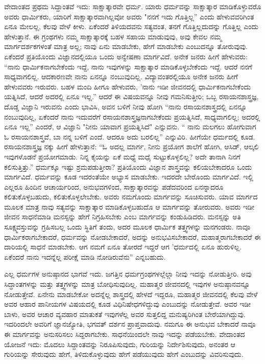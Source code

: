 ವೇದಾಂತದ ಪ್ರಥಮ ಸಿದ್ದಾಂತವೆ ಇದು: ಸಾಕ್ಷಾತ್ಕಾರವೇ ಧರ್ಮ. ಯಾರು ಧರ್ಮವನ್ನು ಸಾಕ್ಷಾತ್ಕಾರ ಮಾಡಿಕೊಳ್ಳುವರೊ ಅವರು ಧಾರ್ಮಿಕರು, ಯಾರಿಗೆ ಸಾಕ್ಷಾತ್ಕಾರವಾಗಿಲ್ಲವೋ ಅವರು "ನನಗೆ ಇದು ಗೊತ್ತಿಲ್ಲ” ಎಂದು ಹೇಳುವವರಿಗಿಂತ ಏನೂ ಮೇಲಲ್ಲ, ಕೆಲವು ವೇಳೆ ಕೀಳು. ಏಕೆಂದರೆ ತಿಳಿಯದವನು ಸತ್ಯವಂತ, ತನಗೆ ಗೊತ್ತಿಲ್ಲದುದನ್ನು ಗೊತ್ತಿಲ್ಲ ಎಂದು ಹೇಳುತ್ತಾನೆ. ಈ ಗ್ರಂಥಗಳು ನಮ್ಮ ಸಾಕ್ಷಾತ್ಕಾರಕ್ಕೆ ಬಹಳ ಸಹಾಯ ಮಾಡುವುವು, ಅವು ಕೇವಲ ನಮ್ಮ ಮಾರ್ಗದರ್ಶಕಗಳಂತೆ ಮಾತ್ರ ಅಲ್ಲ; ನಾವು ಏನು ಮಾಡಬೇಕು, ಹೇಗೆ ಮಾಡಬೇಕು ಎಂಬುದನ್ನೂ ತೋರುವುವು. ಏಕೆಂದರೆ ಪ್ರತಿಯೊಂದು ವಿಜ್ಞಾನದಲ್ಲಿಯೂ ಒಂದು ಅನ್ವೇಷಣಾ ಮಾರ್ಗವಿದೆ. ಅನೇಕ ಜನರು ಹೀಗೆ ಹೇಳುವರು: “ನಾನು ಧಾರ್ಮಿಕನಾಗಬೇಕೆಂದು ಇದ್ದೆ, ನಾನು ಇವುಗಳನ್ನು ಸಾಕ್ಷಾತ್ಕಾರ ಮಾಡಿಕೊಳ್ಳಬೇಕೆಂದು ಇದ್ದೆ. ಆದರೆ ನನಗೆ ಸಾಧ್ಯವಾಗಲಿಲ್ಲ. ಆದಕಾರಣವೇ ನಾನು ಏನನ್ನೂ ನಂಬುವುದಿಲ್ಲ. ವಿದ್ಯಾವಂತರಲ್ಲಿಯೂ ಅನೇಕ ಜನರು ಹೀಗೆ ಹೇಳುವವರು ಇರುವರು. ಬಹಳ ಮಂದಿ ಹೀಗೂ ಹೇಳುವರು, 'ನಾನು ಇಡೀ ಜೀವನದಲ್ಲಿ ಧಾರ್ಮಿಕನಾಗಬೇಕೆಂದು ಯತ್ನಿಸಿದೆ, ಆದರೆ ಅದರಲ್ಲಿ ಏನೂ ಇಲ್ಲ.” ಆದರೆ ಈ ವಿಷಯವನ್ನೂ ನೀವು ಗಮನಿಸುತ್ತೀರಿ; ಒಬ್ಬ ರಸಾಯನಶಾಸ್ತ್ರಜ್ಞ, ದೊಡ್ಡ ವಿಜ್ಞಾನಿ ಇರುವನು ಎಂದು ಭಾವಿಸಿ, ಅವನ ಬಳಿಗೆ ನೀವು ಹೋಗಿ “ನಾನು ರಸಾಯನಶಾಸ್ತ್ರದಲ್ಲಿ ಏನನ್ನೂ ನಂಬುವುದಿಲ್ಲ, ಏಕೆಂದರೆ ನಾನು ಇದುವರೆಗೆ ರಸಾಯನಶಾಸ್ತ್ರಜ್ಞನಾಗಬೇಕೆಂದು ಪ್ರಯತ್ನಿಸಿದೆ, ಸಾಧ್ಯವಾಗಲಿಲ್ಲ; ಅದರಲ್ಲಿ ಏನೂ ಇಲ್ಲ” ಎಂದರೆ, ಆ ವಿಜ್ಞಾನಿ "ನೀನು ಯಾವಾಗ ಪ್ರಯತ್ನಿಸಿದೆ" ಎನ್ನುವನು. “ ನಾನು ಮಲಗಲು ಹೋಗುವಾಗ ಓ ರಸಾಯನಶಾಸ್ತ್ರವೆ, ಬಾ ನನ್ನ ಬಳಿಗೆ ಎಂದೆ. ಆದರೂ ಅದು ಬರಲಿಲ್ಲ” ಎನ್ನುವಿರಿ. ಹೀಗೆಯೇ ಧರ್ಮದಲ್ಲಿ ಕೂಡ. ರಸಾಯನಶಾಸ್ತ್ರಜ್ಞ ನಕ್ಕು ಹೀಗೆ ಹೇಳುತ್ತಾನೆ: “ಓ ಅದಲ್ಲ ಮಾರ್ಗ, ನೀನು ಪ್ರಯೋಗ ಶಾಲೆಗೆ ಹೋಗಿ, ಆಸಿಡ್, ಆಲ್ಕಲಿ ಇವುಗಳೊಡನೆ ಪ್ರಯೋಗಮಾಡು. ನಿನ್ನ ಕೈಯನ್ನು ಏಕೆ ಮಧ್ಯೆ ಮಧೈ ಸುಟ್ಟುಕೊಳ್ಳಲಿಲ್ಲ? ಅದೇ ತಾನಾಗಿ ನಿನಗೆ ಕಲಿಸುತ್ತಿತ್ತು.” ಧರ್ಮಕ್ಕೂ ಇಷ್ಟು ಶ್ರಮಪಡುತ್ತೀರಾ? ಪ್ರತಿಯೊಂದು ವಿಜ್ಞಾನ ಶಾಸ್ತ್ರವನ್ನು ಕಲಿಯಬೇಕಾದರೂ ಒಂದು ಮಾರ್ಗವಿದೆ. ಧರ್ಮವನ್ನು ಕೂಡ ಇದರಂತೆಯೇ ಅಭ್ಯಾಸ ಮಾಡಬೇಕು. ಇದರದೇ ಬೇರೊಂದು ಮಾರ್ಗವಿದೆ. ಇಲ್ಲಿ ಎಲ್ಲರೂ ಹಿಂದಿನ ಆಚಾರ್ಯರಿಂದ, ಅನುಭವಗಳಿಂದ, ಸಾಕ್ಷಾತ್ಕಾರವನ್ನು ಪಡೆದವರಿಂದ ಏನನ್ನಾದರೂ ಕಲಿತುಕೊಳ್ಳಬಹುದು, ಕಲಿತುಕೊಳ್ಳಲೇಬೇಕು. ಅವರು ನಮಗೊಂದು ಮಾರ್ಗವನ್ನು ಸೂಚಿಸುವರು. ಯಾವ ಮಾರ್ಗದ ಮೂಲಕ ಮಾತ್ರ ನಾವು ಸತ್ಯವನ್ನು ಸಾಕ್ಷಾತ್ಕಾರ ಮಾಡಿಕೊಳ್ಳಬಹುದೊ ಆ ಮಾರ್ಗವನ್ನು ತೋರುವರು. ಅವರು ಇಡೀ ಜೀವನ ಸಾಧನೆಮಾಡಿ ಮನಸ್ಸನ್ನು ಹೇಗೆ ನಿಗ್ರಹಿಸಬೇಕು ಎಂಬ ಮಾರ್ಗವನ್ನು ಕಂಡುಹಿಡಿದರು. ಮನಸ್ಸನ್ನು ಅತಿ ಸೂಕ್ಷ್ಮವಸ್ತುವನ್ನು ಗ್ರಹಿಸಬಲ್ಲ ಒಂದು ಸ್ಥಿತಿಗೆ ತಂದು, ಅದರ ಮೂಲಕ ಧಾರ್ಮಿಕ ತತ್ತ್ವಗಳನ್ನು ಮನಗಂಡರು. ನಾವೂ ಧಾರ್ಮಿಕರಾಗಬೇಕಾದರೆ, ಧರ್ಮವನ್ನು ನೋಡಬೇಕಾದರೆ, ಅದನ್ನು ಅನುಭವಿಸಬೇಕಾದರೆ, ಮಹಾತ್ಮರಾಗಬೇಕಾದರೆ ಈ ದಾರಿಯಲ್ಲಿ ಸಾಧನೆ ಮಾಡಬೇಕು. ಆಗ ನಮಗೆ ಏನೂ ತೋರದೆ ಇದ್ದರೆ ಆಗ 'ಧರ್ಮದಲ್ಲಿ ಏನೂ ಹುರುಳಿಲ್ಲ. ಏಕೆಂದರೆ ನಾನು ಇದನ್ನೆಲ್ಲ ಪರೀಕ್ಷೆ ಮಾಡಿ ನೋಡಿರುವೆನು” ಎನ್ನಬಹುದು.

ಎಲ್ಲ ಧರ್ಮಗಳ ಅನುಷ್ಠಾನದ ಭಾಗವೆ ಇದು. ಜಗತ್ತಿನ ಧರ್ಮಗ್ರಂಥಗಳಲ್ಲೆಲ್ಲಾ ನೀವು ಇದನ್ನು ನೋಡುತ್ತೀರಿ. ಅವು ಸಿದ್ಧಾಂತಗಳನ್ನು ಮತ್ತು ತತ್ತ್ವಗಳನ್ನು ಮಾತ್ರ ಬೋಧಿಸುವುದಿಲ್ಲ. ಮಹಾತ್ಮರ ಜೀವನದಲ್ಲಿ ಇವುಗಳ ಅನುಷ್ಠಾನವನ್ನೂ ನೋಡುತ್ತೇವೆ. ಏನೇನು ಮಾಡಬೇಕೋ ಅದನ್ನೆಲ್ಲ ಶಾಸ್ತ್ರದಲ್ಲಿ ಹೇಳದೆ ಇದ್ದರೂ, ಮಹಾತ್ಮರ ಜೀವನದಲ್ಲಿ ಕೆಲವು ವೇಳೆ ಅವರ ಆಹಾರ ಪಾನೀಯಗಳ ವಿಷಯದಲ್ಲಿ ಕೂಡ ವಿಧಿನಿಷೇಧಗಳಿದ್ದುವು ಎಂಬುದನ್ನು ನೋಡುತ್ತೇವೆ. ಅವರ ಇಡೀ ಬಾಳು, ಅವರ ಆಚಾರ ವ್ಯವಹಾರ ಮಾತುಕತೆ ಇವುಗಳೆಲ್ಲ ಅವರ ಸುತ್ತಲಿದ್ದ ಮನುಷ್ಯರಿಗಿಂತ ಬೇರೆಯಾಗಿದ್ದುವು. ಇದರಿಂದಲೇ ಅವರಿಗೆ ಜ್ಞಾನಜ್ಯೋತಿ, ಭಗವತ್ ದರ್ಶನ ಪ್ರಾಪ್ತವಾದುವು. ನಮಗೂ ಈ ಅನುಭವ ಬೇಕಾದರೆ ನಾವೂ ಈ ಮಾರ್ಗವನ್ನು ಅನುಸರಿಸಲು ಸಿದ್ದರಾಗಬೇಕು. ಸಾಧನೆಯಿಂದಲೇ ನಾವು ಇದನ್ನು ಪಡೆಯಬೇಕು. ವೇದಾಂತದ ಯೋಜನೆ ಇದು: ಮೊದಲು ಸಿದ್ದಾಂತವನ್ನು ನಿರೂಪಿಸುವುದು, ಗುರಿಯನ್ನು ನಿರ್ದೇಶಿಸುವುದು, ಅನಂತರ ಆ ಗುರಿಯನ್ನು ಸೇರುವುದು ಹೇಗೆ, ತಿಳಿದುಕೊಳ್ಳುವುದು ಹೇಗೆ ಪಡೆಯುವುದು ಹೇಗೆ ಎಂಬುದನ್ನು ವಿವರಿಸುವುದು.

